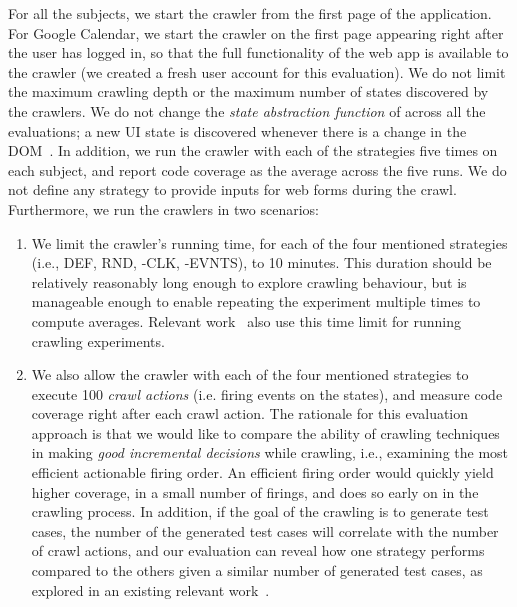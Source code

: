 For all the subjects, we start the crawler from the first page of the application.
For Google Calendar, we start the crawler on the first page appearing right after the user has logged in,
so that the full functionality of the web app is available to the crawler
(we created a fresh user account for this evaluation).
We do not limit the maximum crawling depth
or the maximum number of states discovered by the crawlers.
We do not change the \textit{state abstraction function} of \crawljax
across all the evaluations;
a new UI state is discovered whenever there is a change in the DOM~\cite{Mesbah:2012:Crawljax}.
In addition, we run the crawler with each of the strategies five times on each subject,
and report \js code coverage as the average across the five runs.
We do not define any strategy to provide inputs for web forms
during the crawl.
Furthermore, we run the crawlers in two scenarios:


\begin{enumerate}[leftmargin=*]

\item We limit the crawler's running time, for each of the four mentioned strategies (i.e., DEF, RND, \toolName-CLK, \toolName-EVNTS),
to 10 minutes. 
This duration should be relatively reasonably long enough to explore crawling behaviour,
but is manageable enough to enable repeating the experiment multiple times to compute averages.
Relevant work~\cite{MilaniFard:2013:FeedEx} also use this time limit for running crawling experiments. 

\item We also allow the crawler with each of the four mentioned strategies
to execute 100 \emph{crawl actions} 
(i.e. firing events on the states),
and measure \js code coverage right after each crawl action.
The rationale for this evaluation approach is that
we would like to compare the ability of crawling techniques 
in making \textit{good incremental decisions}
while crawling, 
i.e., examining the most efficient actionable firing order.
An efficient firing order would quickly yield higher coverage,
in a small number of firings, and does so 
early on in the crawling process.
In addition,
if the goal of the crawling is to generate test cases,
the number of the generated test cases will correlate with the number of crawl actions,
and our evaluation can reveal
how one strategy performs compared to the others
given a similar number of generated test cases,
as explored in an existing relevant work~\cite{artzi2011framework}.

\end{enumerate}


